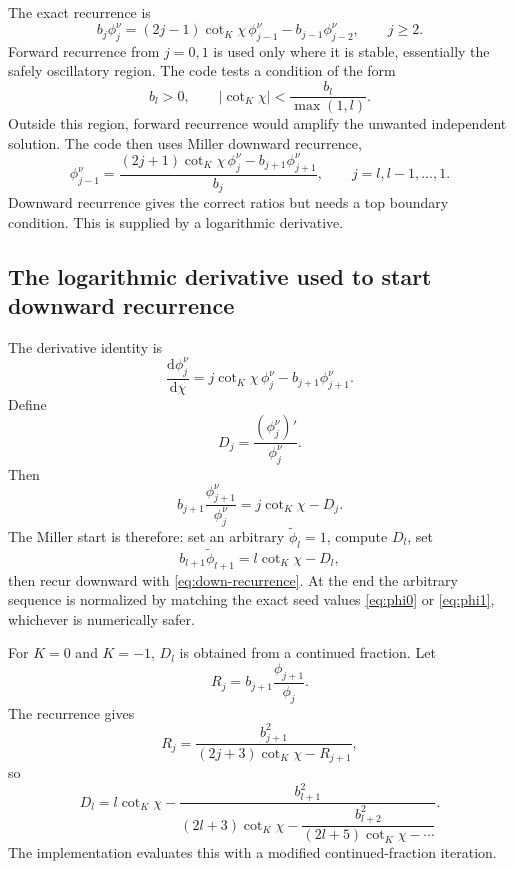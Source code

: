 \documentclass[11pt,a4paper]{article}
\newcommand{\dd}{\mathrm{d}}
\newcommand{\cotK}{\cot_K}
\newcommand{\abs}[1]{\left|#1\right|}
\begin{document}
The exact recurrence is
\begin{equation}
  b_j\phi_j^\nu
  =(2j-1)\cotK\chi\,\phi_{j-1}^\nu
  -b_{j-1}\phi_{j-2}^\nu,
  \qquad j\ge2.
  \label{eq:up-recurrence}
\end{equation}
Forward recurrence from \(j=0,1\) is used only where it is stable, essentially the safely oscillatory region.  The code tests a condition of the form
\begin{equation}
  b_l>0,\qquad \abs{\cotK\chi}<\frac{b_l}{\max(1,l)}.
\end{equation}
Outside this region, forward recurrence would amplify the unwanted independent solution.  The code then uses Miller downward recurrence,
\begin{equation}
  \phi_{j-1}^\nu
  =\frac{(2j+1)\cotK\chi\,\phi_j^\nu-b_{j+1}\phi_{j+1}^\nu}{b_j},
  \qquad j=l,l-1,\ldots,1.
  \label{eq:down-recurrence}
\end{equation}
Downward recurrence gives the correct ratios but needs a top boundary condition.  This is supplied by a logarithmic derivative.

\subsection{The logarithmic derivative used to start downward recurrence}

The derivative identity is
\begin{equation}
  \frac{\dd\phi_j^\nu}{\dd\chi}
  =j\cotK\chi\,\phi_j^\nu-b_{j+1}\phi_{j+1}^\nu.
  \label{eq:deriv-id}
\end{equation}
Define
\begin{equation}
  D_j=\frac{(\phi_j^\nu)'}{\phi_j^\nu}.
\end{equation}
Then
\begin{equation}
  b_{j+1}\frac{\phi_{j+1}^\nu}{\phi_j^\nu}=j\cotK\chi-D_j.
  \label{eq:ratio-logderiv}
\end{equation}
The Miller start is therefore: set an arbitrary \(\widetilde\phi_l=1\), compute \(D_l\), set
\begin{equation}
  b_{l+1}\widetilde\phi_{l+1}=l\cotK\chi-D_l,
  \label{eq:miller-start}
\end{equation}
then recur downward with \eqref{eq:down-recurrence}.  At the end the arbitrary sequence is normalized by matching the exact seed values \eqref{eq:phi0} or \eqref{eq:phi1}, whichever is numerically safer.

For \(K=0\) and \(K=-1\), \(D_l\) is obtained from a continued fraction.  Let
\begin{equation}
  R_j=b_{j+1}\frac{\phi_{j+1}}{\phi_j}.
\end{equation}
The recurrence gives
\begin{equation}
  R_j=\frac{b_{j+1}^2}{(2j+3)\cotK\chi-R_{j+1}},
\end{equation}
so
\begin{equation}
  D_l=l\cotK\chi-
  \frac{b_{l+1}^2}{(2l+3)\cotK\chi-
  \dfrac{b_{l+2}^2}{(2l+5)\cotK\chi-\cdots}}.
  \label{eq:cf-logderiv}
\end{equation}
The implementation evaluates this with a modified continued-fraction iteration.
\end{document}
